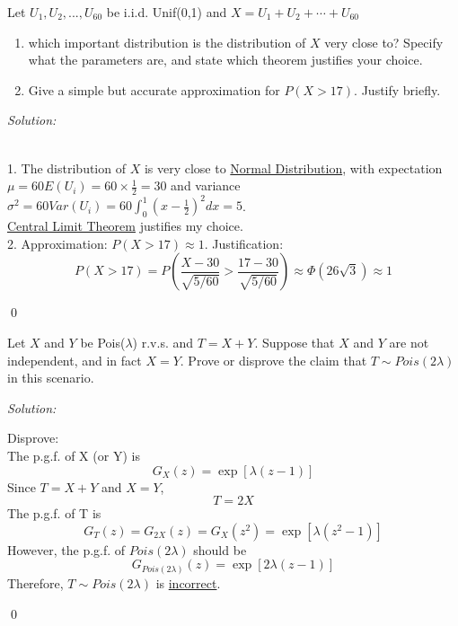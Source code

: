 \documentclass[12pt]{article}
\newenvironment{problem}[2][Problem]{\begin{trivlist}
\item[\hskip \labelsep {\bfseries #1}\hskip \labelsep {\bfseries #2.}]}{\end{trivlist}}
\newenvironment{sol}
    {\emph{Solution:}
    }
    {
    \qed
    }
\begin{document}




\begin{problem}{1}
Let $U_1,U_2,...,U_{60}$ be i.i.d. Unif(0,1) and $X=U_1+U_2+\cdots+U_{60}$
\begin{enumerate}
    \item which important distribution is the distribution of $X$ very close to? Specify what the parameters are, and state which theorem justifies your choice.
    \item Give a simple but accurate approximation for $P(X>17)$. Justify briefly.
\end{enumerate}
\end{problem}
\begin{sol}
\\1. The distribution of $X$ is very close to \uline{Normal Distribution}, with expectation $\mu=60E(U_i)=60\times\frac{1}{2}=30$ and variance $\sigma^2=60Var(U_i)=60\int_0^1(x-\frac{1}{2})^2dx=5$.\\
\uline{Central Limit Theorem} justifies my choice.\\
2. Approximation: $P(X>17)\approx1$. Justification:
\[
P(X>17)=P(\frac{X-30}{\sqrt{5/60}}>\frac{17-30}{\sqrt{5/60}})\approx\Phi(26\sqrt{3})\approx1
\]
\end{sol}

\begin{problem}{2} 
Let $X$ and $Y$ be Pois($\lambda$) r.v.s. and $T=X+Y$. Suppose that $X$ and $Y$ are not independent, and in fact $X=Y$. Prove or disprove the claim that $T\sim Pois(2\lambda)$ in this scenario.
\end{problem}
\begin{sol}
Disprove:\\
The p.g.f. of X (or Y) is
\[
G_X(z)=\exp[\lambda(z-1)]
\]
Since $T=X+Y$ and $X=Y$,
\[
T=2X
\]
The p.g.f. of T is
\[
G_T(z)=G_{2X}(z)=G_X(z^2)=\exp[\lambda(z^2-1)]
\]
However, the p.g.f. of $Pois(2\lambda)$ should be
\[
G_{Pois(2\lambda)}(z)=\exp[2\lambda(z-1)]
\]
Therefore, $T\sim Pois(2\lambda)$ is \uline{incorrect}.
\end{sol}
\end{document}
